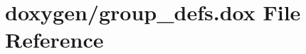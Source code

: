 \hypertarget{group__defs_8dox}{}\section{doxygen/group\+\_\+defs.dox File Reference}
\label{group__defs_8dox}
